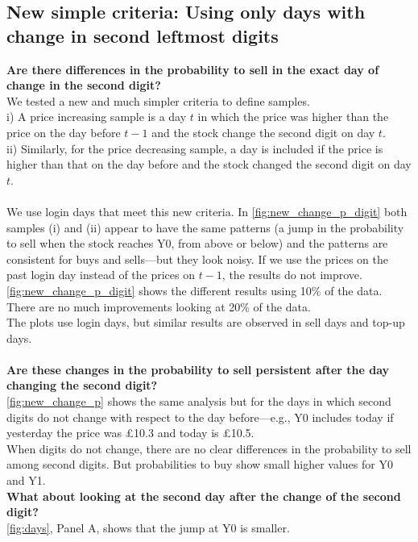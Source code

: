 \documentclass[
	USenglish,12pt,paper=a4,numbers=noenddot,abstract=on,
	final,%
	fullsample,
    ]{scrartcl}
\begin{document}
\subsection{New simple criteria: Using only days with change in second leftmost digits}
\textbf{Are there differences in the probability to sell in the exact day of change in the second digit?} \\
We tested a new and much simpler criteria to define samples.\\i) A price increasing sample is a day $t$ in which the price was higher than the price on the day before $t-1$ and the stock change the second digit on day $t$. \\ ii) Similarly, for the price decreasing sample, a day is included if the price is higher than that on the day before and the stock changed the second digit on day $t$. \\ \\ We use login  days that meet this new criteria. In \ref{fig:new_change_p_digit} both samples (i) and (ii) appear to have the same patterns (a jump in the probability to sell when the stock reaches Y0, from above or below) and the patterns are consistent for buys and sells---but they look  noisy. If we use the prices on the past login day instead of the prices on $t-1$, the results do not improve. \\ \ref{fig:new_change_p_digit} shows the different results using 10\% of the data. There are no much improvements looking at 20\% of the data. \\
The plots use login days, but similar results are observed in sell days and top-up days.
\\ \\
\textbf{Are these changes in the probability to sell persistent after the day changing the second digit?} \\ \ref{fig:new_change_p} shows the same analysis but for the days in which  second digits do not change with respect to the day before---e.g., Y0 includes today if yesterday the price was £10.3 and today is £10.5. \\
When digits do not change, there are no clear differences in the probability to sell among second digits. But probabilities to buy show small higher values for Y0 and Y1. \\
\textbf{What about looking at the second day after the change of the second digit?} \\
\ref{fig:days}, Panel A, shows that the jump at Y0 is smaller. \\
\end{document}
